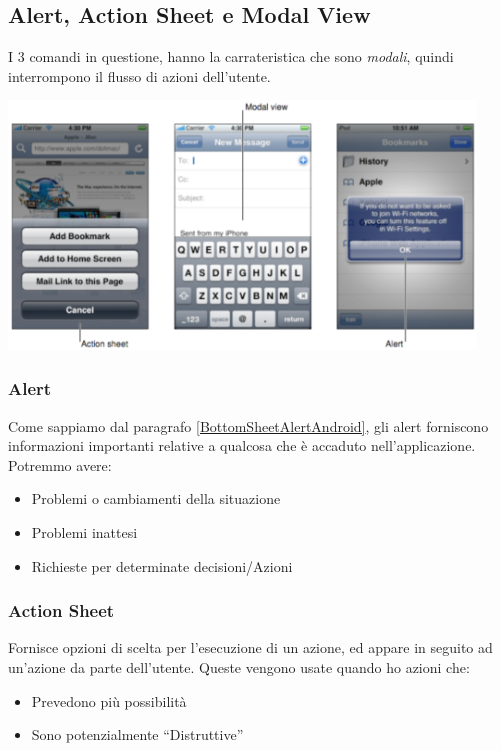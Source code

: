 \documentclass[oneside]{book}
\begin{document}
		\pagebreak
		\subsection{Alert, Action Sheet e Modal View} \label{sez:ActionSheetModalViewAlert}
			I 3 comandi in questione, hanno la carrateristica che sono \emph{modali}, quindi interrompono il flusso di azioni dell'utente.
			\begin{center}
			\includegraphics[height = 66mm]{images/actionalert.png}
			\end{center}

			\subsubsection{Alert} \label{sec:alertIphone}
				Come sappiamo dal paragrafo \ref{BottomSheetAlertAndroid}, gli alert forniscono informazioni importanti relative a qualcosa che è accaduto nell’applicazione. Potremmo avere:
				\begin{itemize}
				\item Problemi o cambiamenti della situazione
				\item Problemi inattesi
				\item Richieste per determinate decisioni/Azioni
				\end{itemize}

			\subsubsection{Action Sheet}
				Fornisce opzioni di scelta per l'esecuzione di un azione, ed appare in seguito ad un'azione da parte dell'utente. Queste vengono usate quando ho azioni che:
				\begin{itemize}
				\item Prevedono più possibilità
				\item Sono potenzialmente ``Distruttive''
				\end{itemize}
\end{document}
